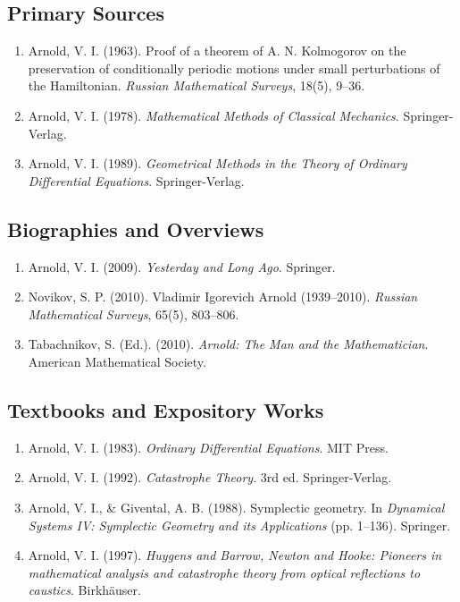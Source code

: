 \subsection*{Primary Sources}
\begin{enumerate}
    \item Arnold, V. I. (1963). Proof of a theorem of A. N. Kolmogorov on the preservation of conditionally periodic motions under small perturbations of the Hamiltonian. \textit{Russian Mathematical Surveys}, 18(5), 9--36.
    \item Arnold, V. I. (1978). \textit{Mathematical Methods of Classical Mechanics}. Springer-Verlag.
    \item Arnold, V. I. (1989). \textit{Geometrical Methods in the Theory of Ordinary Differential Equations}. Springer-Verlag.
\end{enumerate}

\subsection*{Biographies and Overviews}
\begin{enumerate}
    \item Arnold, V. I. (2009). \textit{Yesterday and Long Ago}. Springer.
    \item Novikov, S. P. (2010). Vladimir Igorevich Arnold (1939--2010). \textit{Russian Mathematical Surveys}, 65(5), 803--806.
    \item Tabachnikov, S. (Ed.). (2010). \textit{Arnold: The Man and the Mathematician}. American Mathematical Society.
\end{enumerate}

\subsection*{Textbooks and Expository Works}
\begin{enumerate}
    \item Arnold, V. I. (1983). \textit{Ordinary Differential Equations}. MIT Press.
    \item Arnold, V. I. (1992). \textit{Catastrophe Theory}. 3rd ed. Springer-Verlag.
    \item Arnold, V. I., \& Givental, A. B. (1988). Symplectic geometry. In \textit{Dynamical Systems IV: Symplectic Geometry and its Applications} (pp. 1--136). Springer.
    \item Arnold, V. I. (1997). \textit{Huygens and Barrow, Newton and Hooke: Pioneers in mathematical analysis and catastrophe theory from optical reflections to caustics}. Birkhäuser.
\end{enumerate}
